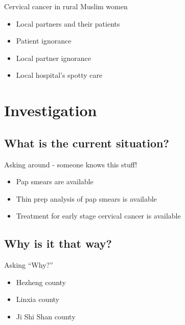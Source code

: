\begin{frame}{Cervical cancer in rural Muslim women}

\begin{itemize}
\itemsep1pt\parskip0pt
\item
  Local partners and their patients
\item
  Patient ignorance
\item
  Local partner ignorance
\item
  Local hospital's spotty care
\end{itemize}

\end{frame}

\section{Investigation}\label{investigation}

\subsection{What is the current
situation?}\label{what-is-the-current-situation}

\begin{frame}{Asking around - someone knows this stuff!}

\begin{itemize}
\itemsep1pt\parskip0pt
\item
  Pap smears are available
\item
  Thin prep analysis of pap smears is available
\item
  Treatment for early stage cervical cancer is available
\end{itemize}

\end{frame}

\subsection{Why is it that way?}\label{why-is-it-that-way}

\begin{frame}{Asking ``Why?''}

\begin{itemize}
\itemsep1pt\parskip0pt
\item
  Hezheng county
\item
  Linxia county
\item
  Ji Shi Shan county
\end{itemize}

\end{frame}

